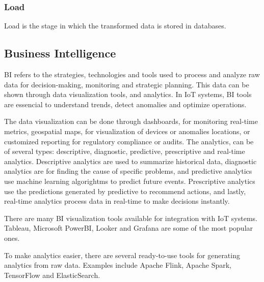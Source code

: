 \subsubsection{Load}
Load is the stage in which the transformed data is stored in databases.

\subsection{Business Intelligence}
\gls{BI} refers to the strategies, technologies and tools used to process and
analyze raw data for decision-making, monitoring and strategic planning.
This data can be shown through data visualization tools, and analytics.
In \gls{IoT} systems, \gls{BI} tools are essencial to understand trends, detect
anomalies and optimize operations.

The data visualization can be done through dashboards, for monitoring real-time
metrics, geospatial maps, for visualization of devices or anomalies locations,
or customized reporting for regulatory compliance or audits. The analytics, can
be of several types: descriptive, diagnostic, predictive, prescriptive and
real-time analytics. Descriptive analytics are used to summarize historical
data, diagnostic analytics are for finding the cause of specific problems, and
predictive analytics use machine learning algorightms to predict future events.
Prescriptive analytics use the predictions generated by predictive to recommend
actions, and lastly, real-time analytics process data in real-time to make
decisions instantly\cite{Adi2020}.

There are many \gls{BI} visualization tools available for integration with \gls{IoT} systems.
Tableau, Microsoft PowerBI, Looker and Grafana are some of the most popular ones.

To make analytics easier, there are several ready-to-use tools for generating
analytics from raw data. Examples include Apache Flink, Apache Spark,
TensorFlow and ElasticSearch.





